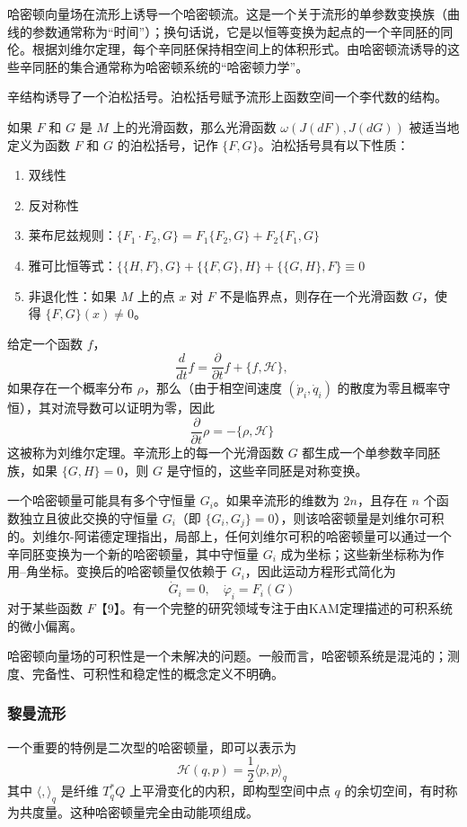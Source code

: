 哈密顿向量场在流形上诱导一个哈密顿流。这是一个关于流形的单参数变换族（曲线的参数通常称为“时间”）；换句话说，它是以恒等变换为起点的一个辛同胚的同伦。根据刘维尔定理，每个辛同胚保持相空间上的体积形式。由哈密顿流诱导的这些辛同胚的集合通常称为哈密顿系统的“哈密顿力学”。

辛结构诱导了一个泊松括号。泊松括号赋予流形上函数空间一个李代数的结构。

如果 \( F \) 和 \( G \) 是 \( M \) 上的光滑函数，那么光滑函数 \( \omega(J(dF), J(dG)) \) 被适当地定义为函数 \( F \) 和 \( G \) 的泊松括号，记作 \( \{F, G\} \)。泊松括号具有以下性质：
\begin{enumerate}
\item 双线性
\item 反对称性
\item 莱布尼兹规则：\(\{F_1 \cdot F_2, G\} = F_1 \{F_2, G\} + F_2 \{F_1, G\}\)
\item 雅可比恒等式：\(\{\{H, F\}, G\} + \{\{F, G\}, H\} + \{\{G, H\}, F\} \equiv 0\)
\item 非退化性：如果 \( M \) 上的点 \( x \) 对 \( F \) 不是临界点，则存在一个光滑函数 \( G \)，使得 \( \{F, G\}(x) \neq 0 \)。
\end{enumerate}
给定一个函数 \( f \)，
\[
\frac{d}{dt} f = \frac{\partial}{\partial t} f + \{f, \mathcal{H}\},~
\]
如果存在一个概率分布 \( \rho \)，那么（由于相空间速度 \( (\dot{p}_i, \dot{q}_i) \) 的散度为零且概率守恒），其对流导数可以证明为零，因此
\[
\frac{\partial}{\partial t} \rho = -\{\rho, \mathcal{H}\}~
\]
这被称为刘维尔定理。辛流形上的每一个光滑函数 \( G \) 都生成一个单参数辛同胚族，如果 \( \{G, H\} = 0 \)，则 \( G \) 是守恒的，这些辛同胚是对称变换。

一个哈密顿量可能具有多个守恒量 \( G_i \)。如果辛流形的维数为 \( 2n \)，且存在 \( n \) 个函数独立且彼此交换的守恒量 \( G_i \)（即 \( \{G_i, G_j\} = 0 \)），则该哈密顿量是刘维尔可积的。刘维尔-阿诺德定理指出，局部上，任何刘维尔可积的哈密顿量可以通过一个辛同胚变换为一个新的哈密顿量，其中守恒量 \( G_i \) 成为坐标；这些新坐标称为作用–角坐标。变换后的哈密顿量仅依赖于 \( G_i \)，因此运动方程形式简化为
\[
\dot{G}_i = 0, \quad \dot{\varphi}_i = F_i(G)~
\]
对于某些函数 \( F \)【9】。有一个完整的研究领域专注于由KAM定理描述的可积系统的微小偏离。

哈密顿向量场的可积性是一个未解决的问题。一般而言，哈密顿系统是混沌的；测度、完备性、可积性和稳定性的概念定义不明确。 
\subsubsection{黎曼流形}
一个重要的特例是二次型的哈密顿量，即可以表示为
\[
\mathcal{H}(q, p) = \frac{1}{2} \langle p, p \rangle_q~
\]
其中 \( \langle , \rangle_q \) 是纤维 \( T^*_q Q \) 上平滑变化的内积，即构型空间中点 \( q \) 的余切空间，有时称为共度量。这种哈密顿量完全由动能项组成。


